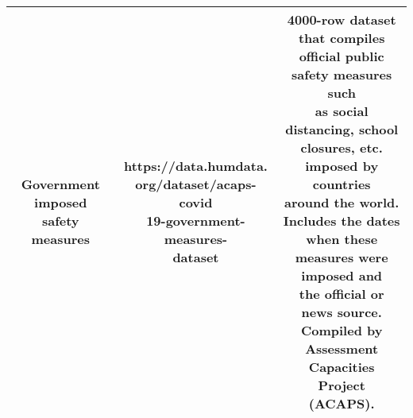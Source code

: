 \documentclass[a4paper,12pt]{article}
\begin{document}
\begin{spacing}{1.3}
\begin{table}
\begin{tabular}{|c|c|c|}
\tabincell{c}{Government imposed \\safety measures} & \tabincell{c}{https://data.humdata.\\org/dataset/acaps-covid\\19-government-measures-\\dataset} & \tabincell{c}{4000-row dataset that compiles \\official public safety measures such \\as social distancing, school \\closures, etc. imposed by countries \\around the world. \\Includes the dates when these \\measures were imposed and \\the official or news source. \\Compiled by Assessment \\Capacities Project (ACAPS).}\\
\hline 
\end{tabular}

\end{table}


\end{spacing}
\end{document}
